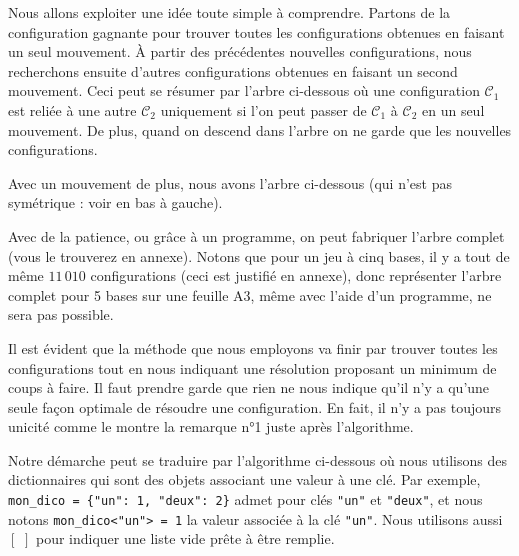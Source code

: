 Nous allons exploiter une idée toute simple à comprendre. Partons de la configuration gagnante pour trouver toutes les configurations obtenues en faisant un seul mouvement.
À partir des précédentes nouvelles configurations, nous recherchons ensuite d'autres configurations obtenues en faisant un second mouvement.
Ceci peut se résumer par l'arbre ci-dessous où une configuration $\mathcal{C}_1$ est reliée à une autre $\mathcal{C}_2$ uniquement si l'on peut passer de $\mathcal{C}_1$ à $\mathcal{C}_2$ en un seul mouvement. De plus, quand on descend dans l'arbre on ne garde que les nouvelles configurations.




Avec un mouvement de plus, nous avons l'arbre ci-dessous (qui n'est pas symétrique : voir en bas à gauche).




Avec de la patience, ou grâce à un programme, on peut fabriquer l'arbre complet (vous le trouverez en annexe). Notons que pour un jeu à cinq bases, il y a tout de même $11\,010$ configurations (ceci est justifié en annexe), donc représenter l'arbre complet pour 5 bases sur une feuille A3, même avec l'aide d'un programme, ne sera pas possible.


\medskip

Il est évident que la méthode que nous employons va finir par trouver toutes les configurations tout en nous indiquant une résolution proposant un minimum de coups à faire.
Il faut prendre garde que rien ne nous indique qu'il n'y a qu'une seule façon optimale de résoudre une configuration. En fait, il n'y a pas toujours unicité comme le montre la remarque n°1 juste après l'algorithme.


\medskip

Notre démarche peut se traduire par l'algorithme ci-dessous où nous utilisons des dictionnaires qui sont des objets associant une valeur à une clé. Par exemple, \verb+mon_dico = {"un": 1, "deux": 2}+ admet pour clés \verb+"un"+ et \verb+"deux"+, et nous notons \verb+mon_dico<"un"> = 1+ la valeur associée à la clé \verb+"un"+.
Nous utilisons aussi $[ \,\, ]$ pour indiquer une liste vide prête à être remplie.


\bigskip

